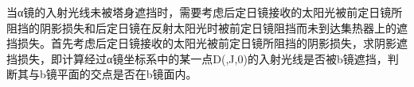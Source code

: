 当α镜的入射光线未被塔身遮挡时，需要考虑后定日镜接收的太阳光被前定日镜所阻挡的阴影损失和后定日镜在反射太阳光时被前定日镜阻挡而未到达集热器上的遮挡损失。首先考虑后定日镜接收的太阳光被前定日镜所阻挡的阴影损失，求阴影遮挡损失，即计算经过α镜坐标系中的某一点D(,J,0)的入射光线是否被b镜遮挡，判断其与b镜平面的交点是否在b镜面内。

